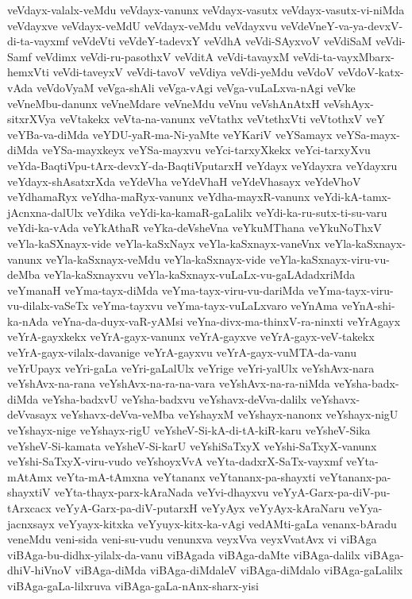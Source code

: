 {veVdayx-valalx-veMdu
veVdayx-vanunx
veVdayx-vasutx
veVdayx-vasutx-vi-niMda
veVdayxve
veVdayx-veMdU
veVdayx-veMdu
veVdayxvu
veVdeVneY-va-ya-devxV-di-ta-vayxmf
veVdeVti
veVdeY-tadevxY
veVdhA
veVdi-SAyxvoV
veVdiSaM
veVdi-Samf
veVdimx
veVdi-ru-pasothxV
veVditA
veVdi-tavayxM
veVdi-ta-vayxMbarx-hemxVti
veVdi-taveyxV
veVdi-tavoV
veVdiya
veVdi-yeMdu
veVdoV
veVdoV-katx-vAda
veVdoVyaM
veVga-shAli
veVga-vAgi
veVga-vuLaLxva-nAgi
veVke
veVneMbu-danunx
veVneMdare
veVneMdu
veVnu
veVshAnAtxH
veVshAyx-sitxrXVya
veVtakekx
veVta-na-vanunx
veVtathx
veVtethxVti
veVtothxV
veY
veYBa-va-diMda
veYDU-yaR-ma-Ni-yaMte
veYKariV
veYSamayx
veYSa-mayx-diMda
veYSa-mayxkeyx
veYSa-mayxvu
veYci-tarxyXkekx
veYci-tarxyXvu
veYda-BaqtiVpu-tArx-devxY-da-BaqtiVputarxH
veYdayx
veYdayxra
veYdayxru
veYdayx-shAsatxrXda
veYdeVha
veYdeVhaH
veYdeVhasayx
veYdeVhoV
veYdhamaRyx
veYdha-maRyx-vanunx
veYdha-mayxR-vanunx
veYdi-kA-tamx-jAcnxna-dalUlx
veYdika
veYdi-ka-kamaR-gaLalilx
veYdi-ka-ru-sutx-ti-su-varu
veYdi-ka-vAda
veYkAthaR
veYka-deVsheVna
veYkuMThana
veYkuNoThxV
veYla-kaSXnayx-vide
veYla-kaSxNayx
veYla-kaSxnayx-vaneVnx
veYla-kaSxnayx-vanunx
veYla-kaSxnayx-veMdu
veYla-kaSxnayx-vide
veYla-kaSxnayx-viru-vu-deMba
veYla-kaSxnayxvu
veYla-kaSxnayx-vuLaLx-vu-gaLAdadxriMda
veYmanaH
veYma-tayx-diMda
veYma-tayx-viru-vu-dariMda
veYma-tayx-viru-vu-dilalx-vaSeTx
veYma-tayxvu
veYma-tayx-vuLaLxvaro
veYnAma
veYnA-shi-ka-nAda
veYna-da-duyx-vaR-yAMsi
veYna-divx-ma-thinxV-ra-ninxti
veYrAgayx
veYrA-gayxkekx
veYrA-gayx-vanunx
veYrA-gayxve
veYrA-gayx-veV-takekx
veYrA-gayx-vilalx-davanige
veYrA-gayxvu
veYrA-gayx-vuMTA-da-vanu
veYrUpayx
veYri-gaLa
veYri-gaLalUlx
veYrige
veYri-yalUlx
veYshAvx-nara
veYshAvx-na-rana
veYshAvx-na-ra-na-vara
veYshAvx-na-ra-niMda
veYsha-badx-diMda
veYsha-badxvU
veYsha-badxvu
veYshavx-deVva-dalilx
veYshavx-deVvasayx
veYshavx-deVva-veMba
veYshayxM
veYshayx-nanonx
veYshayx-nigU
veYshayx-nige
veYshayx-rigU
veYsheV-Si-kA-di-tA-kiR-karu
veYsheV-Sika
veYsheV-Si-kamata
veYsheV-Si-karU
veYshiSaTxyX
veYshi-SaTxyX-vanunx
veYshi-SaTxyX-viru-vudo
veYshoyxVvA
veYta-dadxrX-SaTx-vayxmf
veYta-mAtAmx
veYta-mA-tAmxna
veYtananx
veYtananx-pa-shayxti
veYtananx-pa-shayxtiV
veYta-thayx-parx-kAraNada
veYvi-dhayxvu
veYyA-Garx-pa-diV-pu-tArxcacx
veYyA-Garx-pa-diV-putarxH
veYyAyx
veYyAyx-kAraNaru
veYya-jacnxsayx
veYyayx-kitxka
veYyuyx-kitx-ka-vAgi
vedAMti-gaLa
venanx-bAradu
veneMdu
veni-sida
veni-su-vudu
venunxva
veyxVva
veyxVvatAvx
vi
viBAga
viBAga-bu-didhx-yilalx-da-vanu
viBAgada
viBAga-daMte
viBAga-dalilx
viBAga-dhiV-hiVnoV
viBAga-diMda
viBAga-diMdaleV
viBAga-diMdalo
viBAga-gaLalilx
viBAga-gaLa-lilxruva
viBAga-gaLa-nAnx-sharx-yisi
}
